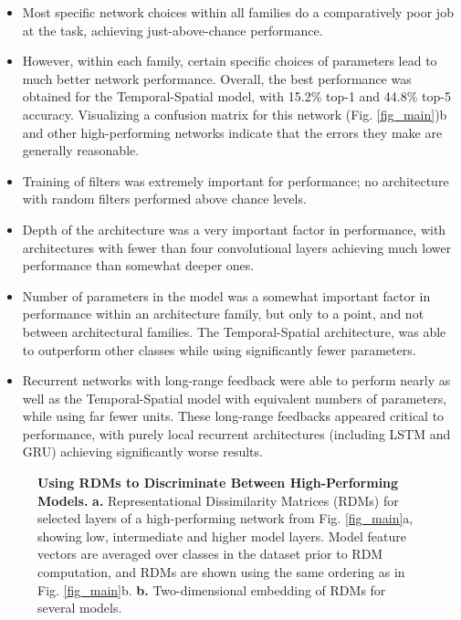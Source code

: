 \begin{itemize}[leftmargin=*,itemsep=0ex,topsep=1ex]
   \item Most specific network choices within all families do a comparatively poor job at the task, achieving just-above-chance performance.
   \item However, within each family, certain specific choices of parameters lead to much better network performance.
   Overall, the best performance was obtained for the Temporal-Spatial model, with 15.2\% top-1 and 44.8\% top-5 accuracy.
   Visualizing a confusion matrix for this network (Fig. \ref{fig_main})b  and other high-performing networks indicate that the errors they make are generally reasonable.
   \item Training of filters was extremely important for performance; no architecture with random filters performed above chance levels.
   \item Depth of the architecture was a very important factor in performance, with architectures with fewer than four convolutional layers achieving much lower performance than somewhat deeper ones.
   \item Number of parameters in the model was a somewhat important factor in performance within an architecture family, but only to a point, and not between architectural families.
   The Temporal-Spatial architecture, was able to outperform other classes while using significantly fewer parameters.
   \item Recurrent networks with long-range feedback were able to perform nearly as well as the Temporal-Spatial model with equivalent numbers of parameters, while using far fewer units.
   These long-range feedbacks appeared critical to performance, with purely local recurrent architectures (including LSTM and GRU) achieving significantly worse results.
\end{itemize}


\begin{figure}
\vspace{-2mm}
\caption{\textbf{Using RDMs to Discriminate Between High-Performing Models.} \textbf{a.} Representational Dissimilarity Matrices (RDMs) for selected layers of a high-performing network from Fig. \ref{fig_main}a, showing low, intermediate and higher model layers.  Model feature vectors are averaged over classes in the dataset prior to RDM computation, and RDMs are shown using the same ordering as in Fig. \ref{fig_main}b. \textbf{b.} Two-dimensional embedding of RDMs for several models.   ~\label{fig_rdms}}
\end{figure}

